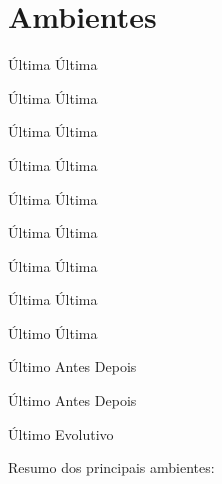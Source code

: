 \chapter{Ambientes}




\begin{pergunta}{Última}
	Última
\end{pergunta}

\begin{resposta}{Última}
	Última
\end{resposta}

\begin{importante}{Última}
	Última
\end{importante}

\begin{requisito}{Última}
	Última
\end{requisito}

\begin{funcionalidade}{Última}
	Última
\end{funcionalidade}

\begin{exemplo}{Última}
	Última
\end{exemplo}

\begin{nota}{Última}
	Última
\end{nota}

\begin{imagine}{Última}
	Última
\end{imagine}

\begin{ajuste}{Último}
	Última
\end{ajuste}

\begin{falha}[1]{Último}
	Antes
	\tcblower
	Depois
\end{falha}


\begin{falha}[0]{Último}
	Antes
	\tcblower
	Depois
\end{falha}

\begin{evolutivo}[0]{Último}
	Evolutivo
\end{evolutivo}


Resumo dos principais \hypertarget{TargetResumoAmbientes}{ambientes}:

